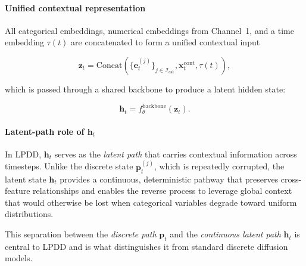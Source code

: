 \documentclass[times, review, 10pt]{elsarticle}
\begin{document}
\paragraph{Unified contextual representation}
All categorical embeddings, numerical embeddings from Channel~1, and a time
embedding $\tau(t)$ are concatenated to form a unified contextual input

\begin{equation}
\mathbf{z}_t =
\mathrm{Concat}\!\left(
\{\mathbf{e}^{(j)}_t\}_{j\in\mathcal{I}_{\mathrm{cat}}},
\mathbf{x}^{\mathrm{cont}}_t,
\tau(t)
\right),
\end{equation}

which is passed through a shared backbone to
produce a latent hidden state:

\begin{equation}
\mathbf{h}_t = f_{\theta}^{\mathrm{backbone}}(\mathbf{z}_t).
\label{eq:project}
\end{equation}

\paragraph{Latent-path role of $\mathbf{h}_t$}
In LPDD, $\mathbf{h}_t$ serves as the \emph{latent path} that carries
contextual information across timesteps. Unlike the discrete state
$\mathbf{p}_t^{(j)}$, which is repeatedly corrupted, the latent state
$\mathbf{h}_t$ provides a continuous, deterministic pathway that preserves
cross-feature relationships and enables the reverse process to leverage global
context that would otherwise be lost when categorical variables degrade toward
uniform distributions.

This separation between the \emph{discrete path} $\mathbf{p}_t$ and the
\emph{continuous latent path} $\mathbf{h}_t$ is central to LPDD and is what
distinguishes it from standard discrete diffusion models.




\end{document}
